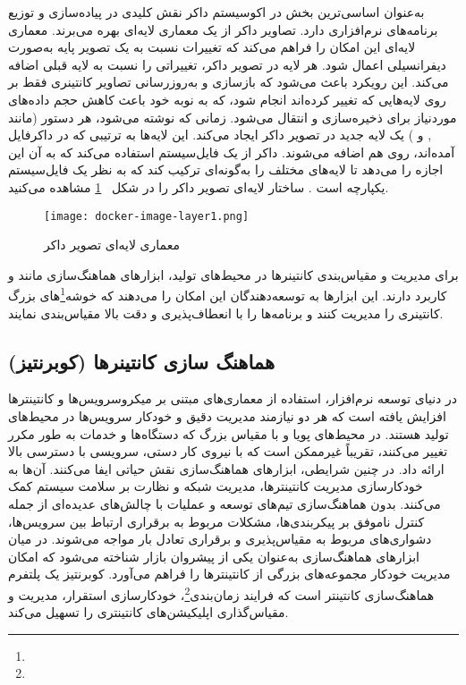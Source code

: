 به‌عنوان اساسی‌ترین بخش در اکوسیستم داکر نقش کلیدی در پیاده‌سازی و توزیع برنامه‌های نرم‌افزاری دارد. تصاویر داکر از یک معماری لایه‌ای بهره می‌برند. معماری لایه‌ای این امکان را فراهم می‌کند که تغییرات نسبت به یک تصویر پایه به‌صورت دیفرانسیلی اعمال شود. هر لایه در تصویر داکر، تغییراتی را نسبت به لایه قبلی اضافه می‌کند. این رویکرد باعث می‌شود که بازسازی و به‌روزرسانی تصاویر کانتینری فقط بر روی لایه‌هایی که تغییر کرده‌اند انجام شود، که به نوبه خود باعث کاهش حجم داده‌های موردنیاز برای ذخیره‌سازی و انتقال می‌شود. زمانی که  نوشته می‌شود، هر دستور (مانند ,  و ) یک لایه جدید در تصویر داکر ایجاد می‌کند. این لایه‌ها به ترتیبی که در داکرفایل آمده‌اند، روی هم اضافه می‌شوند. داکر از یک فایل‌سیستم  استفاده می‌کند که به آن این اجازه را می‌دهد تا لایه‌های مختلف را به‌گونه‌ای ترکیب کند که به نظر یک فایل‌سیستم یکپارچه است \cite{Docker1}. ساختار لایه‌ای تصویر داکر را در شکل 
~\ref{fig: docker image layer}
مشاهده می‌کنید.
\begin{figure}[t]
	\centering
	\texttt{[image: docker-image-layer1.png]}
	\caption{معماری لایه‌ای تصویر داکر}
	\label{fig: docker image layer}
\end{figure}

برای مدیریت و مقیاس‌بندی کانتینرها در محیط‌های تولید، ابزارهای هماهنگ‌سازی مانند  و  کاربرد دارند. این ابزارها به توسعه‌دهندگان این امکان را می‌دهند که خوشه\footnote{}‌های بزرگ کانتینری را مدیریت کنند و برنامه‌ها را با انعطاف‌پذیری و دقت بالا مقیاس‌بندی نمایند.

\subsection{هماهنگ سازی کانتینرها (کوبرنتیز)}

در دنیای توسعه نرم‌افزار، استفاده از معماری‌های مبتنی بر میکروسرویس‌ها و کانتینترها افزایش یافته است که هر دو نیازمند مدیریت دقیق و خودکار سرویس‌ها در محیط‌های تولید هستند. در محیط‌های پویا و با مقیاس بزرگ که دستگاه‌ها و خدمات به طور مکرر تغییر می‌کنند، تقریباً غیرممکن است که با نیروی کار دستی، سرویسی با دسترسی بالا ارائه داد. در چنین شرایطی، ابزارهای هماهنگ‌سازی نقش حیاتی ایفا می‌کنند. آن‌ها به خودکارسازی مدیریت کانتینترها، مدیریت شبکه و نظارت بر سلامت سیستم کمک می‌کنند. بدون هماهنگ‌سازی تیم‌های توسعه و عملیات با چالش‌های عدیده‌ای از جمله کنترل ناموفق بر پیکربندی‌ها، مشکلات مربوط به برقراری ارتباط بین سرویس‌ها، دشواری‌های مربوط به مقیاس‌پذیری و برقراری تعادل بار مواجه می‌شوند. در میان ابزارهای هماهنگ‌سازی  به‌عنوان یکی از پیشروان بازار شناخته می‌شود که امکان مدیریت خودکار مجموعه‌های بزرگی از کانتینترها را فراهم می‌آورد. کوبرنتیز یک پلتفرم هماهنگ‌سازی کانتینتر است که فرایند زمان‌بندی\footnote{}، خودکارسازی استقرار، مدیریت و مقیاس‌گذاری اپلیکیشن‌های کانتینتری را تسهیل می‌کند.

